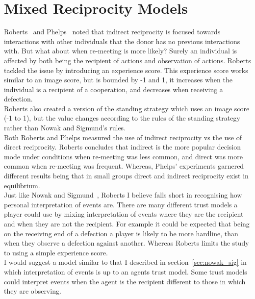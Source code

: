 \documentclass[]{final_report}
\begin{document}
\section{Mixed Reciprocity Models}
Roberts~\cite{evoldirindir} and Phelps~\cite{phelps_game_theoretic_analysis} noted that indirect reciprocity is focused towards interactions with other individuals that the donor has no previous interactions with. But what about when re-meeting is more likely? Surely an individual is affected by both being the recipient of actions and observation of actions. Roberts tackled the issue by introducing an experience score. This experience score works similar to an image score, but is bounded by -1 and 1, it increases when the individual is a recipient of a cooperation, and decreases when receiving a defection.\\
Roberts also created a version of the standing strategy which uses an image score (-1 to 1), but the value changes according to the rules of the standing strategy rather than Nowak and Sigmund's rules.\\
Both Roberts and Phelps measured the use of indirect reciprocity vs the use of direct reciprocity. Roberts concludes that indirect is the more popular decision mode under conditions when re-meeting was less common, and direct was more common when re-meeting was frequent. Whereas, Phelps' experiments garnered different results being that in small groups direct and indirect reciprocity exist in equilibrium.\\
Just like Nowak and Sigmund~\cite{evol_indirect_image}, Roberts I believe falls short in recognising how personal interpretation of events are. There are many different trust models a player could use by mixing interpretation of events where they are the recipient and when they are not the recipient. For example it could be expected that being on the receiving end of a defection a player is likely to be more hardline, than when they observe a defection against another. Whereas Roberts limits the study to using a simple experience score.\\
I would suggest a model similar to that I described in section~\ref{sec:nowak_sig} in which interpretation of events is up to an agents trust model. Some trust models could interpret events when the agent is the recipient different to those in which they are observing.
\end{document}
